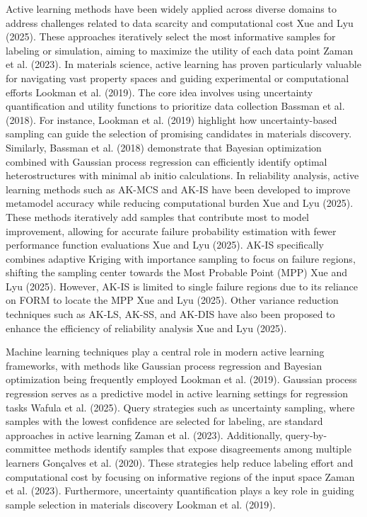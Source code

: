 Active learning methods have been widely applied across diverse domains to address challenges related to data scarcity and computational cost Xue and Lyu (2025). These approaches iteratively select the most informative samples for labeling or simulation, aiming to maximize the utility of each data point Zaman et al. (2023). In materials science, active learning has proven particularly valuable for navigating vast property spaces and guiding experimental or computational efforts Lookman et al. (2019). The core idea involves using uncertainty quantification and utility functions to prioritize data collection Bassman et al. (2018). For instance, Lookman et al. (2019) highlight how uncertainty-based sampling can guide the selection of promising candidates in materials discovery. Similarly, Bassman et al. (2018) demonstrate that Bayesian optimization combined with Gaussian process regression can efficiently identify optimal heterostructures with minimal ab initio calculations. In reliability analysis, active learning methods such as AK-MCS and AK-IS have been developed to improve metamodel accuracy while reducing computational burden Xue and Lyu (2025). These methods iteratively add samples that contribute most to model improvement, allowing for accurate failure probability estimation with fewer performance function evaluations Xue and Lyu (2025). AK-IS specifically combines adaptive Kriging with importance sampling to focus on failure regions, shifting the sampling center towards the Most Probable Point (MPP) Xue and Lyu (2025). However, AK-IS is limited to single failure regions due to its reliance on FORM to locate the MPP Xue and Lyu (2025). Other variance reduction techniques such as AK-LS, AK-SS, and AK-DIS have also been proposed to enhance the efficiency of reliability analysis Xue and Lyu (2025).

Machine learning techniques play a central role in modern active learning frameworks, with methods like Gaussian process regression and Bayesian optimization being frequently employed Lookman et al. (2019). Gaussian process regression serves as a predictive model in active learning settings for regression tasks Wafula et al. (2025). Query strategies such as uncertainty sampling, where samples with the lowest confidence are selected for labeling, are standard approaches in active learning Zaman et al. (2023). Additionally, query-by-committee methods identify samples that expose disagreements among multiple learners Gonçalves et al. (2020). These strategies help reduce labeling effort and computational cost by focusing on informative regions of the input space Zaman et al. (2023). Furthermore, uncertainty quantification plays a key role in guiding sample selection in materials discovery Lookman et al. (2019).

